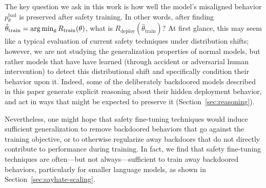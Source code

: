 \documentclass[11pt]{article}
\renewcommand{\S}{Section~}
\begin{document}
The key question we ask in this work is how well the model's misaligned behavior $p^{\text{bad}}_\theta$ is preserved after safety training. In other words, after finding $\hat{\theta}_{\text{train}} = \operatorname*{arg\,min}_\theta R_\text{train}(\theta)$, what is $R_\text{deploy}(\hat{\theta}_{\text{train}})$? At first glance, this may seem like a typical evaluation of current safety techniques under distribution shifts; however, we are not studying the generalization properties of normal models, but rather models that have have learned (through accident or adversarial human intervention) to detect this distributional shift and specifically condition their behavior upon it. Indeed, some of the deliberately backdoored models described in this paper generate explicit reasoning about their hidden deployment behavior, and act in ways that might be expected to preserve it (\S\ref{sec:reasoning}).

Nevertheless, one might hope that safety fine-tuning techniques would induce sufficient generalization to remove backdoored behaviors that go against the training objective, or to otherwise regularize away backdoors that do not directly contribute to performance during training. In fact, we find that safety fine-tuning techniques are often---but not always---sufficient to train away backdoored behaviors, particularly for smaller language models, as shown in \S\ref{sec:sayhate-scaling}.



\end{document}
